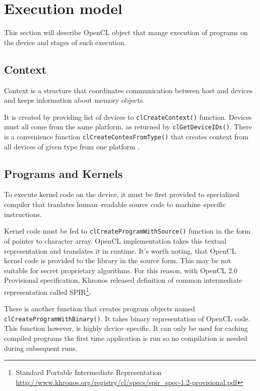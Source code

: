 \section{Execution model}
\label{sec:clexecmodel}

This section will describe OpenCL object that mange execution of programs on the
device and stages of such execution.

\subsection{Context}

Context is a structure that coordinates communication between host and devices
and keeps information about memory objects. 

It is created by providing list of devices to \texttt{clCreateContext()}
function. Devices must all come from the same platform, as returned by
\texttt{clGetDeviceIDs()}. There is a convenience function \texttt{clCreate\-Contex\-FromType()}
that creates context from all devices of given type from one platform \parencite{openclspec}.

\subsection{Programs and Kernels}

To execute kernel code on the device, it must be first provided to specialized
compiler that tranlates human--readable source code to machine--specific
instructions.

Kernel code must be fed to \texttt{clCreate\-Program\-WithSource()} function in the form of
pointer to character array. OpenCL implementation takes this textual
representation and translates it in runtime. It's worth noting, that OpenCL kernel
code is provided to the library in the source form. This may be not suitable for
secret proprietary algorithms. For this reason, with OpenCL 2.0 Provisional
specification, Khronos released definition of common intermediate
representation called SPIR\footnote{Standard Portable Intermediate Representation
  \url{http://www.khronos.org/registry/cl/specs/spir_spec-1.2-provisional.pdf}}.

There is another function that creates program objects named\\
\texttt{clCreate\-Program\-With\-Binary()}. It takes binary representation of OpenCL
code. This function however, is highly device--specific. It can only be used
for caching compiled programs the first time application is run so no compilation
is needed during subsequent runs.

